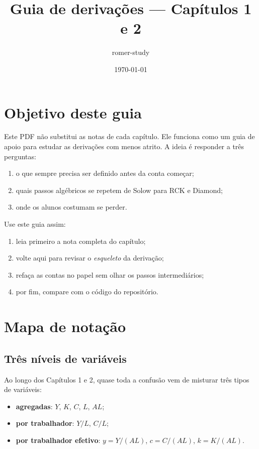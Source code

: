 \documentclass[11pt,a4paper]{article}
\title{Guia de deriva\c{c}\~oes --- Cap\'itulos 1 e 2}
\author{romer-study}
\date{\today}
\begin{document}
\maketitle
\tableofcontents
\bigskip

\section{Objetivo deste guia}

Este PDF n\~ao substitui as notas de cada cap\'itulo. Ele funciona como um
guia de apoio para estudar as deriva\c{c}\~oes com menos atrito. A ideia \'e
responder a tr\^es perguntas:
\begin{enumerate}
  \item o que sempre precisa ser definido antes da conta come\c{c}ar;
  \item quais passos alg\'ebricos se repetem de Solow para RCK e Diamond;
  \item onde os alunos costumam se perder.
\end{enumerate}

\begin{roteiro}
Use este guia assim:
\begin{enumerate}
  \item leia primeiro a nota completa do cap\'itulo;
  \item volte aqui para revisar o \emph{esqueleto} da deriva\c{c}\~ao;
  \item refa\c{c}a as contas no papel sem olhar os passos intermedi\'arios;
  \item por fim, compare com o c\'odigo do reposit\'orio.
\end{enumerate}
\end{roteiro}

\section{Mapa de nota\c{c}\~ao}

\subsection{Tr\^es n\'iveis de vari\'aveis}

Ao longo dos Cap\'itulos 1 e 2, quase toda a confus\~ao vem de misturar tr\^es
tipos de vari\'aveis:

\begin{itemize}
  \item \textbf{agregadas}: \(Y\), \(K\), \(C\), \(L\), \(AL\);
  \item \textbf{por trabalhador}: \(Y/L\), \(C/L\);
  \item \textbf{por trabalhador efetivo}: \(y=Y/(AL)\), \(c=C/(AL)\), \(k=K/(AL)\).
\end{itemize}
\end{document}
